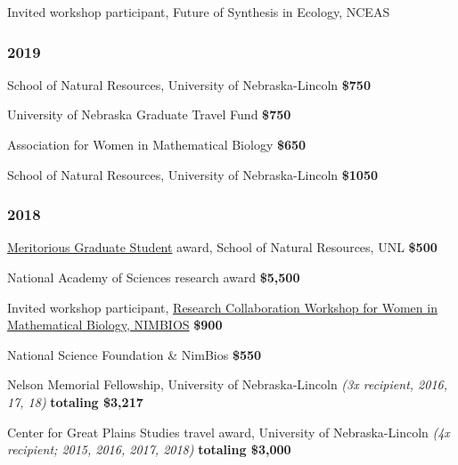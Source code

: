 \documentclass[11pt,]{article}
\providecommand{\tightlist}{%
  \setlength{\itemsep}{0pt}\setlength{\parskip}{0pt}}
\renewenvironment{itemize}{
 \begin{list}{- }{
   \setlength{\leftmargin}{1.5em}
   \setlength{\itemsep}{0pt}
 }
}{
 \end{list}
}
\begin{document}
\begin{itemize}
\tightlist
\item
  Invited workshop participant, Future of Synthesis in Ecology, NCEAS
\end{itemize}

\hypertarget{section-1}{%
\subsubsection{2019}\label{section-1}}

\begin{itemize}
\tightlist
\item
  School of Natural Resources, University of Nebraska-Lincoln
  \hfill \textbf{\$750}
\item
  University of Nebraska Graduate Travel Fund \hfill \textbf{\$750}
\item
  Association for Women in Mathematical Biology \hfill \textbf{\$650}
\item
  School of Natural Resources, University of Nebraska-Lincoln
  \hfill \textbf{\$1050}
\end{itemize}

\hypertarget{section-2}{%
\subsubsection{2018}\label{section-2}}

\begin{itemize}
\tightlist
\item
  \href{http://snr.unl.edu/aboutus/what/awardscomplete.asp}{Meritorious
  Graduate Student} award, School of Natural Resources, UNL
  \hfill \textbf{\$500}
\item
  National Academy of Sciences research award \hfill \textbf{\$5,500}
\item
  Invited workshop participant,
  \href{http://www.nimbios.org/education/WS_wwmb}{Research Collaboration
  Workshop for Women in Mathematical Biology, NIMBIOS}
  \hfill \textbf{\$900}
\item
  National Science Foundation \& NimBios \hfill \textbf{\$550}
\item
  Nelson Memorial Fellowship, University of Nebraska-Lincoln \emph{(3x
  recipient, 2016, 17, 18)} \hfill  \textbf{totaling \$3,217}
\item
  Center for Great Plains Studies travel award, University of
  Nebraska-Lincoln \emph{(4x recipient; 2015, 2016, 2017, 2018)}
  \hfill \textbf{totaling \$3,000}
\end{itemize}
\end{document}
